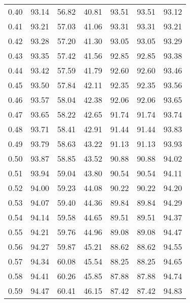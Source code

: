 \begin{tabular}{|c|c|c|c|c|c|c|}
      0.40 &     93.14 &     56.82 &      40.81 &   93.51 &      93.51 &         93.12 \\
      0.41 &     93.21 &     57.03 &      41.06 &   93.31 &      93.31 &         93.21 \\
      0.42 &     93.28 &     57.20 &      41.30 &   93.05 &      93.05 &         93.29 \\
      0.43 &     93.35 &     57.42 &      41.56 &   92.85 &      92.85 &         93.38 \\
      0.44 &     93.42 &     57.59 &      41.79 &   92.60 &      92.60 &         93.46 \\
      0.45 &     93.50 &     57.84 &      42.11 &   92.35 &      92.35 &         93.56 \\
      0.46 &     93.57 &     58.04 &      42.38 &   92.06 &      92.06 &         93.65 \\
      0.47 &     93.65 &     58.22 &      42.65 &   91.74 &      91.74 &         93.74 \\
      0.48 &     93.71 &     58.41 &      42.91 &   91.44 &      91.44 &         93.83 \\
      0.49 &     93.79 &     58.63 &      43.22 &   91.13 &      91.13 &         93.93 \\
      0.50 &     93.87 &     58.85 &      43.52 &   90.88 &      90.88 &         94.02 \\
      0.51 &     93.94 &     59.04 &      43.80 &   90.54 &      90.54 &         94.11 \\
      0.52 &     94.00 &     59.23 &      44.08 &   90.22 &      90.22 &         94.20 \\
      0.53 &     94.07 &     59.40 &      44.36 &   89.84 &      89.84 &         94.29 \\
      0.54 &     94.14 &     59.58 &      44.65 &   89.51 &      89.51 &         94.37 \\
      0.55 &     94.21 &     59.76 &      44.96 &   89.08 &      89.08 &         94.47 \\
      0.56 &     94.27 &     59.87 &      45.21 &   88.62 &      88.62 &         94.55 \\
      0.57 &     94.34 &     60.08 &      45.54 &   88.25 &      88.25 &         94.65 \\
      0.58 &     94.41 &     60.26 &      45.85 &   87.88 &      87.88 &         94.74 \\
      0.59 &     94.47 &     60.41 &      46.15 &   87.42 &      87.42 &         94.83 \\

\end{tabular}
